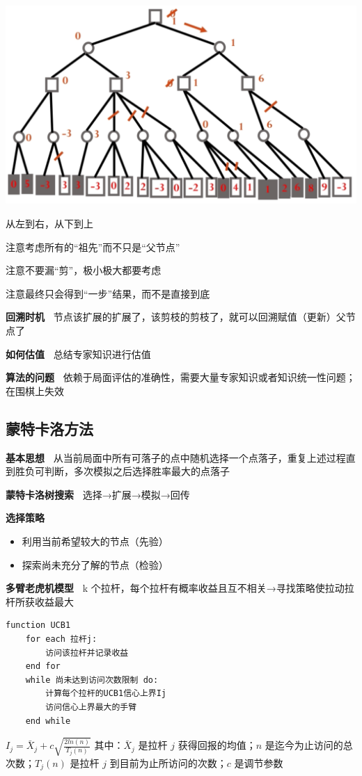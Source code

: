 \documentclass[b4paper, 10pt]{ctexart}
\makeatletter
\newenvironment{figurehere}
{\def\@captype{figure}}
{}
\makeatother
\begin{document}
\begin{multicols}{3}
\begin{figurehere}
    \centering    \includegraphics[width=0.9\linewidth]{figs/alpha-beta.png}
    \label{fig:alpha-beta}
\end{figurehere}

从左到右，从下到上

注意考虑所有的“祖先”而不只是“父节点”

注意不要漏“剪”，极小极大都要考虑

注意最终只会得到“一步”结果，而不是直接到底

\textbf{回溯时机\ } 节点该扩展的扩展了，该剪枝的剪枝了，就可以回溯赋值（更新）父节点了

\textbf{如何估值\ } 总结专家知识进行估值

\textbf{算法的问题\ } 依赖于局面评估的准确性，需要大量专家知识或者知识统一性问题；在围棋上失效

\subsection{蒙特卡洛方法}
\textbf{基本思想\ } 从当前局面中所有可落子的点中随机选择一个点落子，重复上述过程直到胜负可判断，多次模拟之后选择胜率最大的点落子

\textbf{蒙特卡洛树搜索\ } 选择→扩展→模拟→回传

\textbf{选择策略\ }
\begin{itemize}
    \item 利用当前希望较大的节点（先验）
    \item 探索尚未充分了解的节点（检验）
\end{itemize}

\textbf{多臂老虎机模型\ } k 个拉杆，每个拉杆有概率收益且互不相关→寻找策略使拉动拉杆所获收益最大

\begin{lstlisting}[basicstyle=\tiny \ttfamily]
function UCB1
    for each 拉杆j:
        访问该拉杆并记录收益
    end for
    while 尚未达到访问次数限制 do:
        计算每个拉杆的UCB1信心上界Ij
        访问信心上界最大的手臂
    end while
\end{lstlisting}
$
I_j = \bar{X}_j+c\sqrt{\frac{2ln(n)}{T_j(n)}}
$
其中：$\bar{X}_j$ 是拉杆 $j$ 获得回报的均值；$n$ 是迄今为止访问的总次数；$T_j(n)$ 是拉杆 $j$ 到目前为止所访问的次数；$c$ 是调节参数


\end{multicols}
\end{document}
